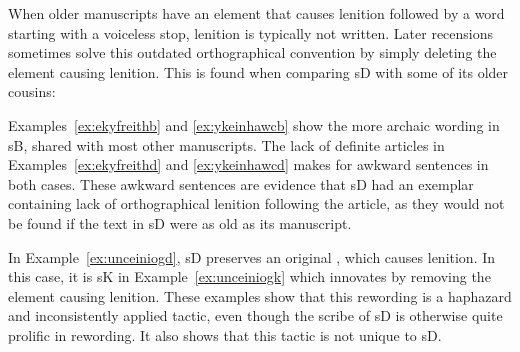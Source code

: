 When older manuscripts have an element that causes lenition followed by a word starting with a voiceless stop, lenition is typically not written. Later recensions sometimes solve this outdated orthographical convention by simply deleting the element causing lenition. This is found when comparing \gls{sD} with some of its older cousins:
\begin{mwl}
\end{mwl}
Examples~\ref{ex:ekyfreithb} and \ref{ex:ykeinhawcb} show the more archaic wording in \gls{sB}, shared with most other manuscripts. The lack of definite articles in Examples~\ref{ex:ekyfreithd} and \ref{ex:ykeinhawcd} makes for awkward sentences in both cases. These awkward sentences are evidence that \gls{sD} had an exemplar containing lack of orthographical lenition following the article, as they would not be found if the text in \gls{sD} were as old as its manuscript.
\begin{mwl}
\end{mwl}
In Example~\ref{ex:unceiniogd}, \gls{sD} preserves an original , which causes lenition. In this case, it is \gls{sK} in Example~\ref{ex:unceiniogk} which innovates by removing the element causing lenition. These examples show that this rewording is a haphazard and inconsistently applied tactic, even though the scribe of \gls{sD} is otherwise quite prolific in rewording. It also shows that this tactic is not unique to \gls{sD}.
